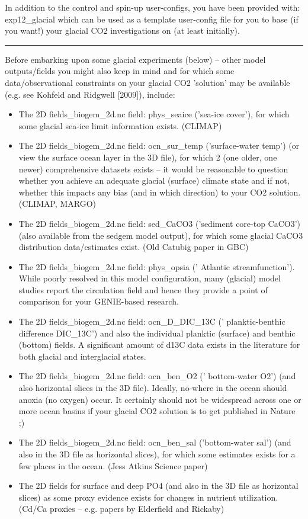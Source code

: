 \documentclass[11pt,fleqn]{book} %
\begin{document}
In addition to the control and spin-up user-configs, you have been provided with: exp12\_glacial which can be used as a template user-config file for you to base (if you want!) your glacial CO2 investigations on (at least initially).

\vspace{1mm}
\noindent\rule{4cm}{0.5pt}
\vspace{2mm}

Before embarking upon some glacial experiments (below) – other model outputs/fields you might
also keep in mind and for which some data/observational constraints on your glacial CO2 'solution'
may be available (e.g. see Kohfeld and Ridgwell [2009]), include:

\begin{itemize}
        \item 
The 2D fields\_biogem\_2d.nc field: phys\_seaice ('sea-ice cover'), for which some glacial
sea-ice limit information exists. (CLIMAP)
        \item 
The 2D fields\_biogem\_2d.nc field: ocn\_sur\_temp ('surface-water temp') (or view the
surface ocean layer in the 3D file), for which 2 (one older, one newer) comprehensive
datasets exists -- it would be reasonable to question whether you achieve an adequate
glacial (surface) climate state and if not, whether this impacts any bias (and in which
direction) to your CO2 solution. (CLIMAP, MARGO)
        \item 
The 2D fields\_biogem\_2d.nc field: sed\_CaCO3 ('sediment core-top CaCO3') (also
available from the sedgem model output), for which some glacial CaCO3 distribution
data/estimates exist. (Old Catubig paper in GBC)
        \item 
The 2D fields\_biogem\_2d.nc field: phys\_opsia (' Atlantic streamfunction'). While poorly
resolved in this model configuration, many (glacial) model studies report the circulation field
and hence they provide a point of comparison for your GENIE-based research.
        \item 
The 2D fields\_biogem\_2d.nc field: ocn\_D\_DIC\_13C (' planktic-benthic difference
DIC\_13C') and also the individual planktic (surface) and benthic (bottom) fields. A
significant amount of d13C data exists in the literature for both glacial and interglacial states.
        \item 
The 2D fields\_biogem\_2d.nc field: ocn\_ben\_O2 (' bottom-water O2') (and also horizontal
slices in the 3D file). Ideally, no-where in the ocean should anoxia (no oxygen) occur. It
certainly should not be widespread across one or more ocean basins if your glacial CO2
solution is to get published in Nature ;)
        \item 
The 2D fields\_biogem\_2d.nc field: ocn\_ben\_sal ('bottom-water sal') (and also in the 3D
file as horizontal slices), for which some estimates exists for a few places in the ocean.
(Jess Atkins Science paper)
        \item 
The 2D fields for surface and deep PO4 (and also in the 3D file as horizontal slices) as
some proxy evidence exists for changes in nutrient utilization. (Cd/Ca proxies – e.g. papers
by Elderfield and Rickaby)

\end{itemize}
\end{document}
